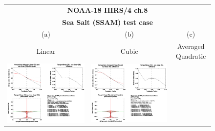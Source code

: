 \begin{figure}[htp]
  \centering
  \begin{tabular}{c c c}
    \multicolumn{3}{c}{\qquad\sffamily\textbf{NOAA-18 HIRS/4 ch.8}}\\
    \multicolumn{3}{c}{\qquad\sffamily\textbf{Sea Salt (SSAM) test case}}\\
    \qquad\textsf{(a)} & \qquad\textsf{(b)}  & \qquad\textsf{(c)} \\
    \qquad\textsf{Linear} & \qquad\textsf{Cubic}  & \qquad\textsf{Averaged Quadratic} \\
    \includegraphics[bb=90 400 300 540,clip,scale=0.7]{graphics/Aerosol/TL/hirs4_n18.ch8.SSAM.NLIN.dw_dReff.eps} &
    \includegraphics[bb=90 400 300 540,clip,scale=0.7]{graphics/Aerosol/TL/hirs4_n18.ch8.SSAM.NCUBIC.dw_dReff.eps} &

\end{tabular}
\end{figure}
